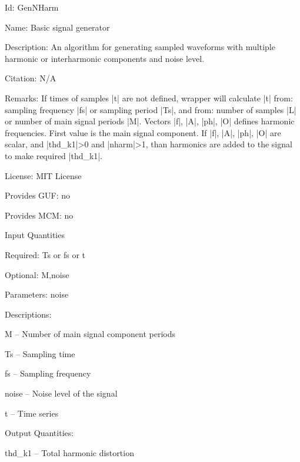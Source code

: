 \begin{tightdesc}
\item [Id:] GenNHarm
\item [Name:] Basic signal generator
\item [Description:] An algorithm for generating sampled waveforms with multiple harmonic or interharmonic components and noise level.
\item [Citation:] N/A
\item [Remarks:] If times of samples |t| are not defined, wrapper will calculate |t| from: sampling frequency |fs| or sampling period |Ts|, and from: number of samples |L| or number of main signal periods |M|. Vectors |f|, |A|, |ph|, |O| defines harmonic frequencies. First value is the main signal component. If |f|, |A|, |ph|, |O| are scalar, and |thd\_k1|>0 and |nharm|>1, than harmonics are added to the signal to make required |thd\_k1|.
\item [License:] MIT License
\item [Provides GUF:] no
\item [Provides MCM:] no
\item [Input Quantities] \rule{0em}{0em}
    \begin{tightdesc}
    \item [Required:] 
        \textsf{Ts} or \textsf{fs} or \textsf{t}
    \item [Optional:] 
        \textsf{M},\enspace \textsf{noise}
    \item [Parameters:] 
        \textsf{noise}
    \item [Descriptions:] \rule{0em}{0em}
        \begin{tightdesc}
            \item[\textsf{M}] -- Number of main signal component periods
            \item[\textsf{Ts}] -- Sampling time
            \item[\textsf{fs}] -- Sampling frequency
            \item[\textsf{noise}] -- Noise level of the signal
            \item[\textsf{t}] -- Time series
        \end{tightdesc}
    \end{tightdesc}
\item [Output Quantities:] \rule{0em}{0em}
    \begin{tightdesc}
        \item[\textsf{thd\_k1}] -- Total harmonic distortion
    \end{tightdesc}
\end{tightdesc}
